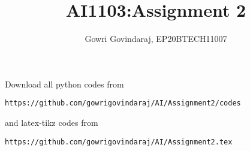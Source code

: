 \documentclass[journal,12pt,twocolumn]{IEEEtran}
\DeclareMathOperator*{\Res}{Res}
\begin{document}
\newcommand{\BEQA}{\begin{eqnarray}}
\newcommand{\EEQA}{\end{eqnarray}}
\newcommand{\define}{\stackrel{\triangle}{=}}

\raggedbottom
\setlength{\parindent}{0pt}
\providecommand{\mbf}{\mathbf}
\providecommand{\pr}[1]{\ensuremath{\Pr\left(#1\right)}}
\providecommand{\qfunc}[1]{\ensuremath{Q\left(#1\right)}}
\providecommand{\sbrak}[1]{\ensuremath{{}\left[#1\right]}}
\providecommand{\lsbrak}[1]{\ensuremath{{}\left[#1\right.}}
\providecommand{\rsbrak}[1]{\ensuremath{{}\left.#1\right]}}
\providecommand{\brak}[1]{\ensuremath{\left(#1\right)}}
\providecommand{\lbrak}[1]{\ensuremath{\left(#1\right.}}
\providecommand{\rbrak}[1]{\ensuremath{\left.#1\right)}}
\providecommand{\cbrak}[1]{\ensuremath{\left\{#1\right\}}}
\providecommand{\lcbrak}[1]{\ensuremath{\left\{#1\right.}}
\providecommand{\rcbrak}[1]{\ensuremath{\left.#1\right\}}}
\theoremstyle{remark}
\newtheorem{rem}{Remark}
\newcommand{\sgn}{\mathop{\mathrm{sgn}}}
\providecommand{\abs}[1]{\vert#1\vert}
\providecommand{\res}[1]{\Res\displaylimits_{#1}} 
\providecommand{\norm}[1]{\lVert#1\rVert}
\providecommand{\mtx}[1]{\mathbf{#1}}
\providecommand{\mean}[1]{E[ #1 ]}
\providecommand{\fourier}{\overset{\mathcal{F}}{ \rightleftharpoons}}
\providecommand{\system}{\overset{\mathcal{H}}{ \longleftrightarrow}}
\newcommand{\solution}{\noindent \textbf{Solution: }}
\newcommand{\cosec}{\,\text{cosec}\,}
\providecommand{\dec}[2]{\ensuremath{\overset{#1}{\underset{#2}{\gtrless}}}}
\newcommand{\myvec}[1]{\ensuremath{\begin{pmatrix}#1\end{pmatrix}}}
\newcommand{\mydet}[1]{\ensuremath{\begin{vmatrix}#1\end{vmatrix}}}
\makeatletter
{}
\makeatother
\let\StandardTheFigure\thefigure
\let\vec\mathbf
\renewcommand{\thefigure}{\theproblem}
\def\putbox#1#2#3{\makebox[0in][l]{\makebox[#1][l]{}\raisebox{\baselineskip}[0in][0in]{\raisebox{#2}[0in][0in]{#3}}}}
     \def\rightbox#1{\makebox[0in][r]{#1}}
     \def\centbox#1{\makebox[0in]{#1}}
     \def\topbox#1{\raisebox{-\baselineskip}[0in][0in]{#1}}
     \def\midbox#1{\raisebox{-0.5\baselineskip}[0in][0in]{#1}}
\vspace{3cm}
\title{AI1103:Assignment 2}
\author{Gowri Govindaraj, EP20BTECH11007}
\maketitle
\newpage
\bigskip
\renewcommand{\thefigure}{\theenumi}
\renewcommand{\thetable}{\theenumi}
Download all python codes from 
\begin{lstlisting}
https://github.com/gowrigovindaraj/AI/Assignment2/codes
\end{lstlisting}
%
and latex-tikz codes from 
%
\begin{lstlisting}
https://github.com/gowrigovindaraj/AI/Assignment2.tex
\end{lstlisting}
\end{document}

